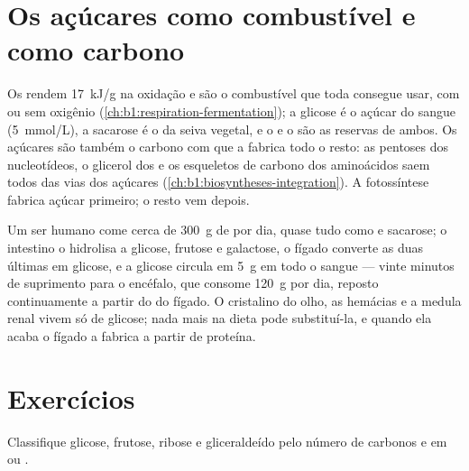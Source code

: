\section{Os açúcares como combustível e como carbono}

\begin{proposition}\label{prop:b1:carbohydrates:fuel}
Os  rendem \qty{17}{kJ/g} na oxidação e são o combustível
que toda  consegue usar, com ou sem oxigênio
(\cref{ch:b1:respiration-fermentation}); a glicose é o açúcar do sangue
(\qty{5}{mmol/L}), a sacarose é o da seiva vegetal, e o  e o
 são as reservas de ambos. Os açúcares são também o carbono
com que a  fabrica todo o resto: as pentoses dos nucleotídeos, o
glicerol dos  e os esqueletos de carbono dos aminoácidos saem
todos das vias dos açúcares
(\cref{ch:b1:biosyntheses-integration}). A fotossíntese fabrica açúcar
primeiro; o resto vem depois.
\end{proposition}

\begin{example}\label{ex:b1:carbohydrates:day}
Um ser humano come cerca de \qty{300}{g} de  por dia, quase
tudo como  e sacarose; o intestino o hidrolisa a glicose, frutose e
galactose, o fígado converte as duas últimas em glicose, e a glicose
circula em \qty{5}{g} em todo o sangue --- vinte minutos de suprimento
para o encéfalo, que consome \qty{120}{g} por dia, reposto
continuamente a partir do  do fígado. O cristalino do olho, as
hemácias e a medula renal vivem só de glicose; nada mais na dieta pode
substituí-la, e quando ela acaba o fígado a fabrica a partir de
proteína.
\end{example}

\section{Exercícios}

\begin{exercise}[$\star$]\label{exo:b1:carbohydrates:1}
Classifique glicose, frutose, ribose e gliceraldeído pelo número de
carbonos e em  ou .
\end{exercise}

